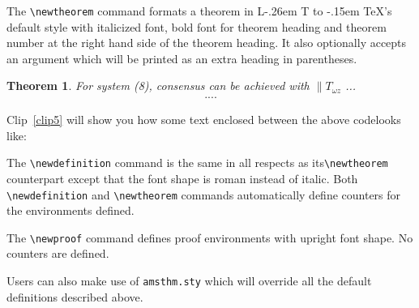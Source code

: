 \documentclass[a4paper,12pt]{article}
\makeatletter
\def\bs{\expandafter\@gobble\string\\}
\DeclareRobustCommand{\LaTeX}{L\kern-.26em%
        {\sbox\z@ T%
         \vbox to\ht\z@{\hbox{\check@mathfonts
           \fontsize\sf@size\z@
           \math@fontsfalse\selectfont
          A\,}%
         \vss}%
        }%
     \kern-.15em%
    \TeX}
\makeatother
\begin{document}
\begin{vquote}
 \newtheorem{thm}{Theorem}
 \newtheorem{lem}[thm]{Lemma}
\end{vquote}

The \verb+\newtheorem+ command formats a
theorem in \LaTeX's default style with italicized font, bold font
for theorem heading and theorem number at the right hand side of the
theorem heading.  It also optionally accepts an argument which
will be printed as an extra heading in parentheses. 

\begin{vquote}
  \begin{thm} 
   For system (8), consensus can be achieved with 
   $\|T_{\omega z}$
   ...
     \begin{eqnarray}\label{10}
     ....
     \end{eqnarray}
  \end{thm}
\end{vquote}  

Clip~\ref{clip5} will show you how some text enclosed between the
above code\goodbreak \noindent looks like:

\vspace*{6pt}
\def\rulecolor{blue!70}
\src{{\ttfamily\color{verbcolor}\bs newtheorem}}
\def\rulecolor{orange}

The \verb+\newdefinition+ command is the same in
all respects as its\linebreak \verb+\newtheorem+ counterpart except that
the font shape is roman instead of italic.  Both
\verb+\newdefinition+ and \verb+\newtheorem+ commands
automatically define counters for the environments defined.

\vspace*{6pt}
\def\rulecolor{blue!70}
\src{{\ttfamily\color{verbcolor}\bs newdefinition}}
\def\rulecolor{orange}

The \verb+\newproof+ command defines proof environments with
upright font shape.  No counters are defined. 

\vspace*{6pt}
\def\rulecolor{blue!70}
\src{{\ttfamily\color{verbcolor}\bs newproof}}
\def\rulecolor{orange}

Users can also make use of \verb+amsthm.sty+ which will override
all the default definitions described above.
\end{document}
